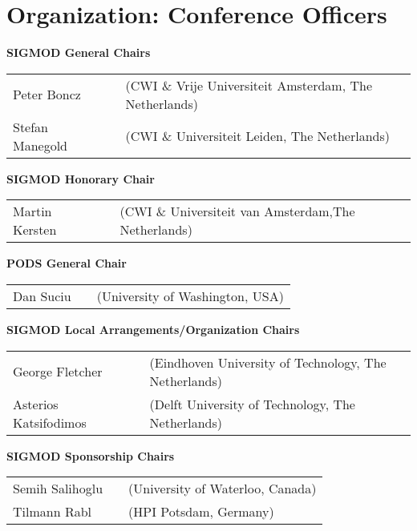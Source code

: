 
\clearpage
\ifodd\value{page}\hbox{}\newpage\fi
\section{Organization: Conference Officers}

{
\setlength{\tabcolsep}{0pt}
\small

\textbf{SIGMOD General Chairs}

\begin{tabular}{lp{.5em}l}
Peter Boncz	&& \textsf{\footnotesize(CWI \& Vrije Universiteit Amsterdam, The Netherlands)}	\\
Stefan Manegold	&& \textsf{\footnotesize(CWI \& Universiteit Leiden, The Netherlands)}	\\
\end{tabular}

\vfill
\textbf{SIGMOD Honorary Chair}

\begin{tabular}{lp{.5em}l}
Martin Kersten	&& \textsf{\footnotesize(CWI \& Universiteit van Amsterdam,The Netherlands)}
\end{tabular}

\vfill
\textbf{PODS General Chair}

\begin{tabular}{lp{.5em}l}
Dan Suciu	&& \textsf{\footnotesize(University of Washington, USA)}
\end{tabular}

\vfill
\textbf{SIGMOD Local Arrangements/Organization Chairs}

\begin{tabular}{lp{.5em}l}
George Fletcher	&& \textsf{\footnotesize(Eindhoven University of Technology, The Netherlands)}	\\
Asterios Katsifodimos	&& \textsf{\footnotesize(Delft University of Technology, The Netherlands)}
\end{tabular}

\vfill
\textbf{SIGMOD Sponsorship Chairs}

\begin{tabular}{lp{.5em}l}
Semih Salihoglu	&& \textsf{\footnotesize(University of Waterloo, Canada)}	\\
Tilmann Rabl	&& \textsf{\footnotesize(HPI Potsdam, Germany)}
\end{tabular}

}
